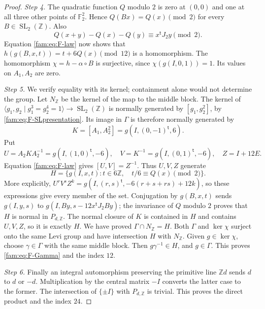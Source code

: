 \documentclass[11pt,a4paper]{article}
\theoremstyle{plain}
\theoremstyle{definition}
\begin{document}
\begin{proof}
\par\noindent\textit{Step 4.} The quadratic function $Q$ modulo $2$ is zero at $(0,0)$ and one at all
three other points of $\mathbb F_2^2$.  Hence $Q(Bx)=Q(x)\pmod2$ for every
$B\in\operatorname{SL}_2(\mathbb Z)$.  Also
\[
 Q(x+y)-Q(x)-Q(y)\equiv x^{\mathsf t}J_2y\pmod2.
\]
Equation \eqref{fam:eq:F-law} now shows that
$h(g(B,x,t))=t+6Q(x)\pmod{12}$ is a homomorphism.
The homomorphism $\chi=h-\alpha\circ B$ is surjective, since
$\chi(g(I,0,1))=1$.  Its values on $A_1,A_2$ are zero.

\par\noindent\textit{Step 5.} We verify equality with its kernel; containment alone would not determine
the group.  Let $N_{\mathbb Z}$ be the kernel of the map to the middle
block.  The kernel of
$\langle g_1,g_2\mid g_1^3=g_2^4=1\rangle\to
\operatorname{SL}_2(\mathbb Z)$ is normally generated by
$[g_1,g_2^2]$, by \eqref{fam:eq:F-SLpresentation}.  Its image in $\Gamma$ is
therefore normally generated by
\[
 K=[A_1,A_2^2]=g(I,(0,-1)^{\mathsf t},6).
\]
Put
\[
 U=A_2KA_2^{-1}=g(I,(1,0)^{\mathsf t},-6),\quad
 V=K^{-1}=g(I,(0,1)^{\mathsf t},-6),\quad Z=I+12E.
\]
Equation \eqref{fam:eq:F-law} gives $[U,V]=Z^{-1}$.  Thus $U,V,Z$ generate
\begin{equation}\label{fam:eq:F-H}
 H=\{g(I,x,t):t\in6\mathbb Z,\quad t/6\equiv Q(x)\pmod2\}.
\end{equation}
More explicitly,
$U^rV^sZ^k=g(I,(r,s)^{\mathsf t},-6(r+s+rs)+12k)$, so these expressions
give every member of the set.  Conjugation by $g(B,x,t)$ sends
$g(I,y,s)$ to $g(I,By,s-12x^{\mathsf t}J_2By)$; the invariance of $Q$
modulo $2$ proves that $H$ is normal in $P_{d,\mathbb Z}$.  The normal
closure of $K$ is contained in $H$ and contains $U,V,Z$, so it is exactly
$H$.  We have proved $\Gamma\cap N_{\mathbb Z}=H$.  Both $\Gamma$ and
$\ker\chi$ surject onto the same Levi group and have intersection $H$
with $N_{\mathbb Z}$.  Given $g\in\ker\chi$, choose $\gamma\in\Gamma$
with the same middle block.  Then $g\gamma^{-1}\in H$, and $g\in\Gamma$.
This proves \eqref{fam:eq:F-Gamma} and the index $12$.

\par\noindent\textit{Step 6.} Finally an integral automorphism preserving the primitive line
$\mathbb Zd$ sends $d$ to $d$ or $-d$.  Multiplication by the central
matrix $-I$ converts the latter case to the former.  The intersection of
$\{\pm I\}$ with $P_{d,\mathbb Z}$ is trivial.  This proves the direct
product and the index $24$.
\end{proof}
\end{document}
